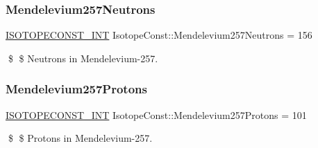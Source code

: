 \subsubsection{\texorpdfstring{Mendelevium257\+Neutrons}{Mendelevium257Neutrons}}
{\footnotesize\ttfamily \mbox{\hyperlink{group___isotope_const-_macros_ga5f18360b3e99483a35c32d789e62621c}{I\+S\+O\+T\+O\+P\+E\+C\+O\+N\+S\+T\+\_\+\+I\+NT}} Isotope\+Const\+::\+Mendelevium257\+Neutrons = 156}

\$ \$ Neutrons in Mendelevium-\/257. \mbox{\label{group___isotope_const-_mendelevium-_md257_ga81cba946aa6047bedfdddf3a11c23173}} 
\subsubsection{\texorpdfstring{Mendelevium257\+Protons}{Mendelevium257Protons}}
{\footnotesize\ttfamily \mbox{\hyperlink{group___isotope_const-_macros_ga5f18360b3e99483a35c32d789e62621c}{I\+S\+O\+T\+O\+P\+E\+C\+O\+N\+S\+T\+\_\+\+I\+NT}} Isotope\+Const\+::\+Mendelevium257\+Protons = 101}

\$ \$ Protons in Mendelevium-\/257. 